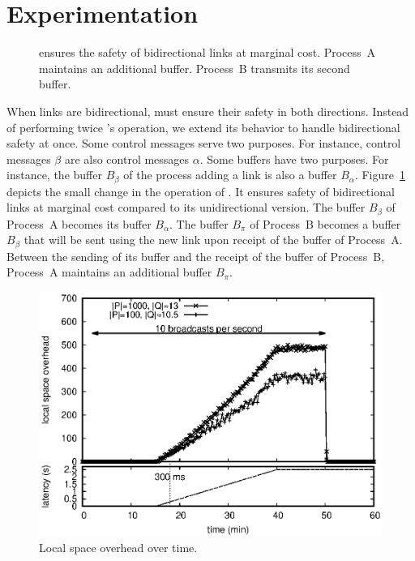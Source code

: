 
\section{Experimentation}
\label{sec:experimentation}

\begin{figure}
  \begin{center}
  
  \caption{\label{fig:bibroadcast}\RPCBROADCAST ensures the safety of bidirectional links
    at marginal cost. Process~A maintains an additional buffer. Process~B transmits its
    second buffer.}
  \end{center}
\end{figure}

When links are bidirectional, \RPCBROADCAST must ensure their safety in both
directions. Instead of performing twice \RPCBROADCAST's operation, we extend its
behavior to handle bidirectional safety at once. Some control messages serve two
purposes. For instance, control messages $\beta$ are also control messages
$\alpha$. Some buffers have two purposes. For instance, the buffer $B_\beta$ of
the process adding a link is also a buffer $B_\alpha$.
Figure~\ref{fig:bibroadcast} depicts the small change in the operation of
\RPCBROADCAST. It ensures safety of bidirectional links at marginal cost
compared to its unidirectional version. The buffer $B_\beta$ of Process~A
becomes its buffer $B_\alpha$. The buffer $B_\pi$ of Process~B becomes a buffer
$B_\beta$ that will be sent using the new link upon receipt of the buffer of
Process~A. Between the sending of its buffer and the receipt of the buffer of
Process~B, Process~A maintains an additional buffer $B_\pi$.


\begin{figure}
  \begin{center}
    \includegraphics[width=0.8\columnwidth]{./img/overhead.eps}
    \caption{Local space overhead over time.}
  \end{center}
\end{figure}

